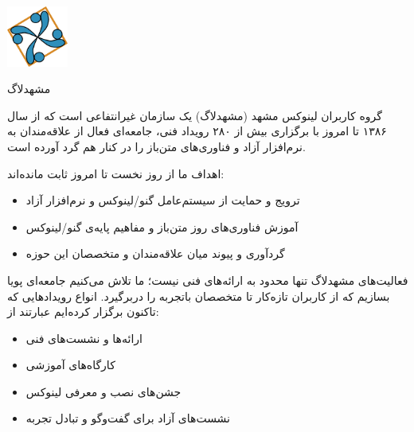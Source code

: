 \documentclass[a4paper]{article}
\begin{document}


\begin{minipage}{0.2\textwidth}
  \includegraphics[width=2cm]{assets/logo.png}
\end{minipage}
\hfill
\begin{minipage}{0.7\textwidth}
  \raggedleft
  {\Huge مشهدلاگ}\\\vspace{0.2cm}
  {\Large {}}
\end{minipage}

\vspace{1cm}

گروه کاربران لینوکس مشهد (مشهدلاگ) یک سازمان غیرانتفاعی است که از سال ۱۳۸۶ تا امروز با برگزاری بیش از ۲۸۰ رویداد فنی، جامعه‌ای فعال از علاقه‌مندان به نرم‌افزار آزاد و فناوری‌های متن‌باز را در کنار هم گرد آورده است.

اهداف ما از روز نخست تا امروز ثابت مانده‌اند:

\begin{itemize}
\item ترویج و حمایت از سیستم‌عامل گنو/لینوکس و نرم‌افزار آزاد
\item آموزش فناوری‌های روز متن‌باز و مفاهیم پایه‌ی گنو/لینوکس
\item گردآوری و پیوند میان علاقه‌مندان و متخصصان این حوزه
\end{itemize}

فعالیت‌های مشهدلاگ تنها محدود به ارائه‌های فنی نیست؛ ما تلاش می‌کنیم جامعه‌ای پویا بسازیم که از کاربران تازه‌کار تا متخصصان باتجربه را دربرگیرد.
انواع رویدادهایی که تاکنون برگزار کرده‌ایم عبارتند از:

\begin{itemize}
\item ارائه‌ها و نشست‌های فنی
\item کارگاه‌های آموزشی
\item جشن‌های نصب و معرفی لینوکس
\item نشست‌های آزاد برای گفت‌وگو و تبادل تجربه
\end{itemize}
\end{document}
